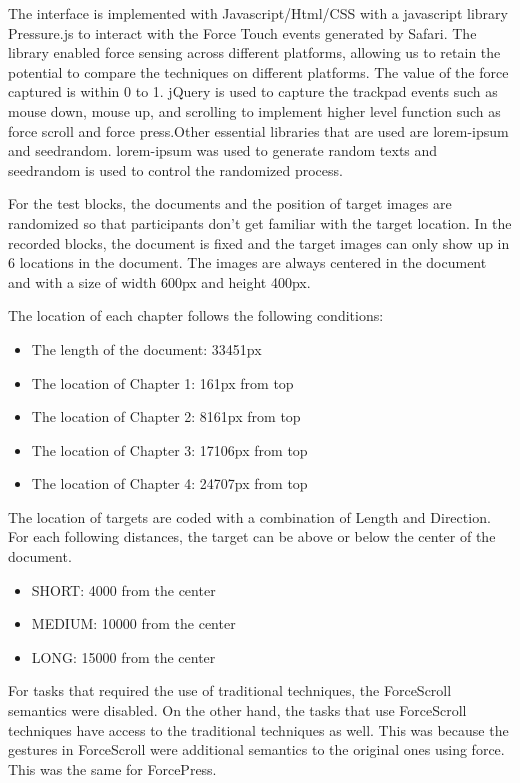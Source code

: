 \documentclass{sigchi}
\begin{document}
The interface is implemented with Javascript/Html/CSS with a javascript library Pressure.js\cite{pressurejs} to interact with the Force Touch events generated by Safari. The library enabled force sensing across different platforms, allowing us to retain the potential to compare the techniques on different platforms. The value of the force captured is within 0 to 1. jQuery is used to capture the trackpad events such as mouse down, mouse up, and scrolling to implement higher level function such as force scroll and force press.Other essential libraries that are used are lorem-ipsum and seedrandom. lorem-ipsum was used to generate random texts and seedrandom is used to control the randomized process.

For the test blocks, the documents and the position of target images are randomized so that participants don’t get familiar with the target location. In the recorded blocks, the document is fixed and the target images can only show up in 6 locations in the document. The images are always centered in the document and with a size of width 600px and height 400px.

The location of each chapter follows the following conditions:
\begin{itemize}
\item The length of the document: 33451px
\item The location of Chapter 1: 161px from top
\item The location of Chapter 2: 8161px from top
\item The location of Chapter 3: 17106px from top
\item The location of Chapter 4: 24707px from top
\end{itemize}

The location of targets are coded with a combination of Length and Direction. For each following distances, the target can be above or below the center of the document.

\begin{itemize}
	\item SHORT: 4000 from the center
	\item MEDIUM: 10000 from the center
	\item LONG: 15000 from the center
\end{itemize}

For tasks that required the use of traditional techniques, the ForceScroll semantics were disabled. On the other hand, the tasks that use ForceScroll techniques have access to the traditional techniques as well. This was because the gestures in ForceScroll were additional semantics to the original ones using force. This was the same for ForcePress.
\end{document}

